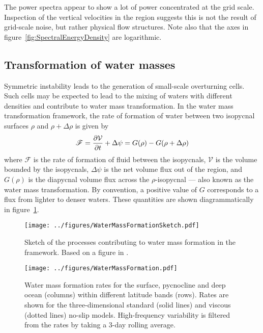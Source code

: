 The power spectra appear to show a lot of power concentrated at the grid scale. Inspection of the vertical velocities in the region suggests this is not the result of grid-scale noise, but rather physical flow structures. Note also that the axes in figure~\ref{fig:SpectralEnergyDensity} are logarithmic.

\subsection{Transformation of water masses}
\label{subsubsec:WaterMassTransformation}
Symmetric instability leads to the generation of small-scale overturning cells. Such cells may be expected to lead to the mixing of waters with different densities and contribute to water mass transformation. In the \citet{Walin1982} water mass transformation framework, the rate of formation of water between two isopycnal surfaces $\rho$ and $\rho + \Delta \rho$ is given by
\begin{equation}
    \mathscr{F} = \pdv{\mathcal{V}}{t} + \Delta \psi = G(\rho) - G(\rho + \Delta \rho)
    \label{eq:WallinFormation}
\end{equation}
where $\mathscr{F}$ is the rate of formation of fluid between the isopycnals, $\mathcal{V}$ is the volume bounded by the isopycnals, $\Delta \psi$ is the net volume flux out of the region, and $G(\rho)$ is the diapycnal volume flux across the $\rho$-isopycnal --- also known as the water mass transformation. By convention, a positive value of $G$ corresponds to a flux from lighter to denser waters. These quantities are shown diagrammatically in figure~\ref{fig:WaterMassFormationSketch}.

\begin{figure}[t]
    \centering
    \texttt{[image: ../figures/WaterMassFormationSketch.pdf]}
    \caption{Sketch of the processes contributing to water mass formation in the \citet{Walin1982} framework. Based on a figure in \citet{Williams2011}.}
    \label{fig:WaterMassFormationSketch}
\end{figure}

\begin{figure}[p]
    \centering
    \texttt{[image: ../figures/WaterMassFormation.pdf]}
    \caption{Water mass formation rates for the surface, pycnocline and deep ocean (columns) within different latitude bands (rows). Rates are shown for the three-dimensional standard (solid lines) and viscous (dotted lines) no-slip models. High-frequency variability is filtered from the rates by taking a 3-day rolling average.}
    \label{fig:WaterMassFormation}
\end{figure}


